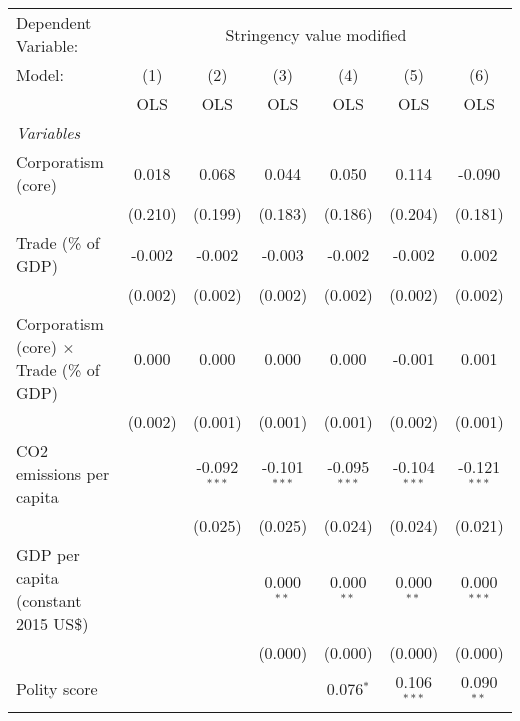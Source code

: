 
\begingroup
\centering
\begin{tabular}{lcccccc}
   \toprule
   Dependent Variable: & \multicolumn{6}{c}{Stringency value modified}\\
   Model:                                          & (1)     & (2)            & (3)            & (4)            & (5)            & (6)\\  
                                                   &  OLS    & OLS            & OLS            & OLS            & OLS            & OLS\\  
   \midrule
   \emph{Variables}\\
   Corporatism (core)                              & 0.018   & 0.068          & 0.044          & 0.050          & 0.114          & -0.090\\   
                                                   & (0.210) & (0.199)        & (0.183)        & (0.186)        & (0.204)        & (0.181)\\   
   Trade (\% of GDP)                               & -0.002  & -0.002         & -0.003         & -0.002         & -0.002         & 0.002\\   
                                                   & (0.002) & (0.002)        & (0.002)        & (0.002)        & (0.002)        & (0.002)\\   
   Corporatism (core) $\times$ Trade (\% of GDP)   & 0.000   & 0.000          & 0.000          & 0.000          & -0.001         & 0.001\\   
                                                   & (0.002) & (0.001)        & (0.001)        & (0.001)        & (0.002)        & (0.001)\\   
   CO2 emissions per capita                        &         & -0.092$^{***}$ & -0.101$^{***}$ & -0.095$^{***}$ & -0.104$^{***}$ & -0.121$^{***}$\\   
                                                   &         & (0.025)        & (0.025)        & (0.024)        & (0.024)        & (0.021)\\   
   GDP per capita (constant 2015 US\$)             &         &                & 0.000$^{**}$   & 0.000$^{**}$   & 0.000$^{**}$   & 0.000$^{***}$\\   
                                                   &         &                & (0.000)        & (0.000)        & (0.000)        & (0.000)\\   
   Polity score                                    &         &                &                & 0.076$^{*}$    & 0.106$^{***}$  & 0.090$^{**}$\\   

\end{tabular}
